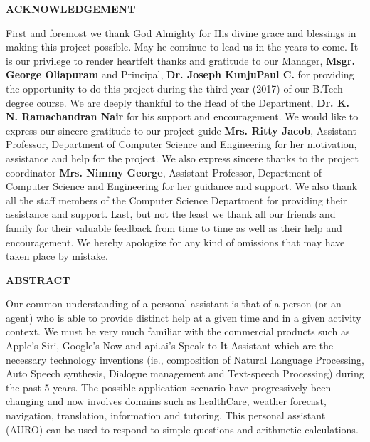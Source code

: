 \documentclass[a4 paper,11pt]{report}
\begin{document}
\newpage
\thispagestyle{empty}
\begin{center}
	\Large \textbf{ACKNOWLEDGEMENT}
	\vspace{1cm}
\end{center}
First and foremost we thank God Almighty for His divine grace and blessings in making this project possible.  May he continue to lead us in the years to come.  It is our privilege to render heartfelt thanks and gratitude to our Manager, \textbf{Msgr. George Oliapuram} and Principal, \textbf{Dr. Joseph KunjuPaul C.} for providing the opportunity to do this project during the third year (2017) of our B.Tech degree course.  We are deeply thankful to the Head of the Department, \textbf{Dr. K. N. Ramachandran Nair} for his support and encouragement.  We would like to express our sincere gratitude to our project guide \textbf{Mrs. Ritty Jacob}, Assistant Professor, Department of Computer Science and Engineering for her motivation, assistance and help for the project.  We also express sincere thanks to the project coordinator \newline \textbf{Mrs. Nimmy George}, Assistant Professor, Department of Computer Science and Engineering for her guidance and support.  We also thank all the staff members of the Computer Science Department for providing their assistance and support.  Last, but not the least we thank all our friends and family for their valuable feedback from time to time as well as their help and encouragement.  We hereby apologize for any kind of omissions that may have taken place by mistake.



\newpage
\thispagestyle{empty}
\begin{center}
\Large \textbf{ABSTRACT}
\vspace{1cm}
\end{center}
Our common understanding of a personal assistant is that of a person (or an agent) who is able to provide distinct help at a given time and in a given activity context. We must be very much familiar with the commercial products such as Apple’s Siri, Google’s Now and api.ai’s Speak to It Assistant which are the necessary technology inventions (ie., composition of Natural Language Processing, Auto Speech synthesis, Dialogue management and Text-speech Processing) during the past 5 years. The possible application scenario have progressively been changing and now involves domains such as healthCare, weather forecast, navigation, translation, information and tutoring. This personal assistant (AURO) can be used to respond to simple questions and arithmetic calculations.
\end{document}
